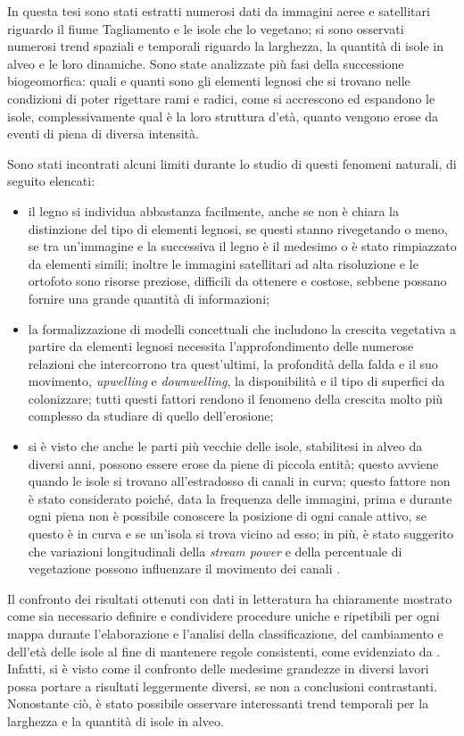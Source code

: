 In questa tesi sono stati estratti numerosi dati da immagini aeree e satellitari riguardo il fiume Tagliamento e le isole che lo vegetano; si sono osservati numerosi trend spaziali e temporali riguardo la larghezza, la quantità di isole in alveo e le loro dinamiche.
Sono state analizzate più fasi della successione biogeomorfica: quali e quanti sono gli elementi legnosi che si trovano nelle condizioni di poter rigettare rami e radici, come si accrescono ed espandono le isole, complessivamente qual è la loro struttura d'età, quanto vengono erose da eventi di piena di diversa intensità.

Sono stati incontrati alcuni limiti durante lo studio di questi fenomeni naturali, di seguito elencati:
%
\begin{itemize}
	\item il legno si individua abbastanza facilmente, anche se non è chiara la distinzione del tipo di elementi legnosi, se questi stanno rivegetando o meno, se tra un'immagine e la successiva il legno è il medesimo o è stato rimpiazzato da elementi simili;
	inoltre le immagini satellitari ad alta risoluzione e le ortofoto sono risorse preziose, difficili da ottenere e costose, sebbene possano fornire una grande quantità di informazioni;
	\item la formalizzazione di modelli concettuali che includono la crescita vegetativa a partire da elementi legnosi necessita l'approfondimento delle numerose relazioni che intercorrono tra quest'ultimi, la profondità della falda e il suo movimento, \emph{upwelling} e \emph{downwelling}, la disponibilità e il tipo di superfici da colonizzare;
	tutti questi fattori rendono il fenomeno della crescita molto più complesso da studiare di quello dell'erosione;
	\item si è visto che anche le parti più vecchie delle isole, stabilitesi in alveo da diversi anni, possono essere erose da piene di piccola entità;
	questo avviene quando le isole si trovano all'estradosso di canali in curva;
	questo fattore non è stato considerato poiché, data la frequenza delle immagini, prima e durante ogni piena non è possibile conoscere la posizione di ogni canale attivo, se questo è in curva e se un'isola si trova vicino ad esso;
	in più, è stato suggerito che variazioni longitudinali della \emph{stream power} e della percentuale di vegetazione possono influenzare il movimento dei canali .
\end{itemize}
%

Il confronto dei risultati ottenuti con dati in letteratura ha chiaramente mostrato come sia necessario definire e condividere procedure uniche e ripetibili per ogni mappa durante l'elaborazione e l'analisi della classificazione, del cambiamento e dell'età delle isole al fine di mantenere regole consistenti, come evidenziato da .
Infatti, si è visto come il confronto delle medesime grandezze in diversi lavori possa portare a risultati leggermente diversi, se non a conclusioni contrastanti.
Nonostante ciò, è stato possibile osservare interessanti trend temporali per la larghezza e la quantità di isole in alveo.


